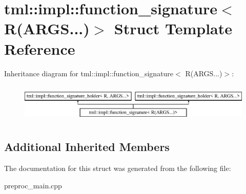 \hypertarget{structtml_1_1impl_1_1function__signature_3_01R_07ARGS_8_8_8_08_4}{\section{tml\+:\+:impl\+:\+:function\+\_\+signature$<$ R(A\+R\+G\+S...)$>$ Struct Template Reference}
\label{structtml_1_1impl_1_1function__signature_3_01R_07ARGS_8_8_8_08_4}
}
Inheritance diagram for tml\+:\+:impl\+:\+:function\+\_\+signature$<$ R(A\+R\+G\+S...)$>$\+:\begin{figure}[H]
\begin{center}
\leavevmode
\includegraphics[height=1.879195cm]{structtml_1_1impl_1_1function__signature_3_01R_07ARGS_8_8_8_08_4}
\end{center}
\end{figure}
\subsection*{Additional Inherited Members}


The documentation for this struct was generated from the following file\+:\begin{DoxyCompactItemize}
\item 
preproc\+\_\+main.\+cpp\end{DoxyCompactItemize}
